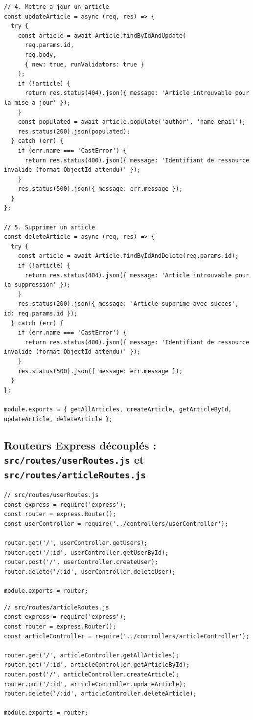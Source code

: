 \documentclass[12pt, a4paper]{article}
\begin{document}
\begin{lstlisting}
// 4. Mettre a jour un article
const updateArticle = async (req, res) => {
  try {
    const article = await Article.findByIdAndUpdate(
      req.params.id,
      req.body,
      { new: true, runValidators: true }
    );
    if (!article) {
      return res.status(404).json({ message: 'Article introuvable pour la mise a jour' });
    }
    const populated = await article.populate('author', 'name email');
    res.status(200).json(populated);
  } catch (err) {
    if (err.name === 'CastError') {
      return res.status(400).json({ message: 'Identifiant de ressource invalide (format ObjectId attendu)' });
    }
    res.status(500).json({ message: err.message });
  }
};

// 5. Supprimer un article
const deleteArticle = async (req, res) => {
  try {
    const article = await Article.findByIdAndDelete(req.params.id);
    if (!article) {
      return res.status(404).json({ message: 'Article introuvable pour la suppression' });
    }
    res.status(200).json({ message: 'Article supprime avec succes', id: req.params.id });
  } catch (err) {
    if (err.name === 'CastError') {
      return res.status(400).json({ message: 'Identifiant de ressource invalide (format ObjectId attendu)' });
    }
    res.status(500).json({ message: err.message });
  }
};

module.exports = { getAllArticles, createArticle, getArticleById, updateArticle, deleteArticle };
\end{lstlisting}

\subsection{Routeurs Express découplés : \texttt{src/routes/userRoutes.js} et \texttt{src/routes/articleRoutes.js}}
\begin{lstlisting}
// src/routes/userRoutes.js
const express = require('express');
const router = express.Router();
const userController = require('../controllers/userController');

router.get('/', userController.getUsers);
router.get('/:id', userController.getUserById);
router.post('/', userController.createUser);
router.delete('/:id', userController.deleteUser);

module.exports = router;
\end{lstlisting}

\begin{lstlisting}
// src/routes/articleRoutes.js
const express = require('express');
const router = express.Router();
const articleController = require('../controllers/articleController');

router.get('/', articleController.getAllArticles);
router.get('/:id', articleController.getArticleById);
router.post('/', articleController.createArticle);
router.put('/:id', articleController.updateArticle);
router.delete('/:id', articleController.deleteArticle);

module.exports = router;
\end{lstlisting}
\end{document}
